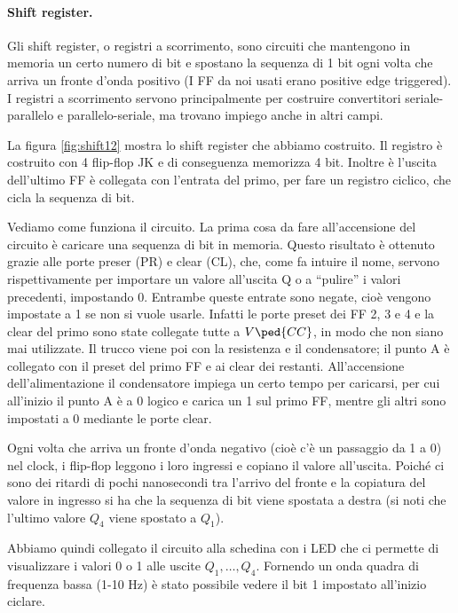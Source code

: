 \paragraph{Shift register.}

Gli shift register, o registri a scorrimento, sono circuiti che mantengono in memoria un certo numero di bit
e spostano la sequenza di 1 bit ogni volta che arriva un fronte d'onda positivo (I FF da noi usati erano positive edge triggered).
I registri a scorrimento
servono principalmente per costruire convertitori seriale-parallelo e parallelo-seriale, ma trovano
impiego anche in altri campi.


La figura \ref{fig:shift12} mostra lo shift register che abbiamo costruito. Il registro
è costruito con 4 flip-flop JK e di conseguenza memorizza 4 bit. Inoltre è l'uscita dell'ultimo FF
è collegata con l'entrata del primo, per fare un registro ciclico, che cicla la sequenza di bit.

Vediamo come funziona il circuito. La prima cosa da fare all'accensione del circuito è caricare
una sequenza di bit in memoria. Questo risultato è ottenuto grazie alle porte preser (PR) e clear (CL),
che, come fa intuire il nome, servono rispettivamente per importare un valore all'uscita Q o a
``pulire'' i valori precedenti, impostando 0. Entrambe queste entrate sono negate, cioè vengono impostate
a 1 se non si vuole usarle. Infatti le porte preset dei FF 2, 3 e 4 e la clear del primo sono
state collegate tutte a $V\ped{CC}$, in modo che non siano mai utilizzate. Il trucco viene poi con
la resistenza e il condensatore; il punto A è collegato con il preset del primo FF
e ai clear dei restanti. All'accensione dell'alimentazione il condensatore impiega un certo
tempo per caricarsi, per cui all'inizio il punto A è a 0 logico e carica un 1 sul primo FF,
mentre gli altri sono impostati a 0 mediante le porte clear.

Ogni volta che arriva un fronte d'onda negativo (cioè c'è un passaggio da 1 a 0) nel clock,
i flip-flop leggono i loro ingressi e copiano il valore all'uscita. Poiché ci sono
dei ritardi di pochi nanosecondi tra l'arrivo del fronte e la copiatura del valore in ingresso
si ha che la sequenza di bit viene spostata a destra (si noti che l'ultimo valore $Q_4$ viene spostato
a $Q_1$).

Abbiamo quindi collegato il circuito alla schedina con i LED che ci permette di visualizzare i valori
0 o 1 alle uscite $Q_1,\dots,Q_4$. Fornendo un onda quadra di frequenza bassa (1-10 Hz) è stato possibile
vedere il bit 1 impostato all'inizio ciclare.

